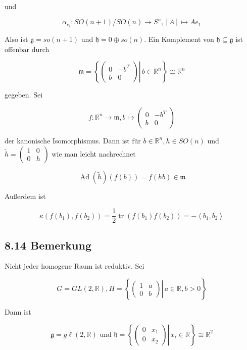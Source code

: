 \documentclass[10pt, letterpaper]{article}
\begin{document}
und

$$
\alpha_{e_{i}}: S O(n+1) / S O(n) \rightarrow S^{n},[A] \mapsto A e_{1}
$$

Also ist $\mathfrak{g}=s o(n+1)$ und $\mathfrak{h}=0 \oplus s o(n)$. Ein Komplement von $\mathfrak{h} \subseteq \mathfrak{g}$ ist offenbar durch

$$
\mathfrak{m}=\left\{\left.\left(\begin{array}{cc}
0 & -b^{T} \\
b & 0
\end{array}\right) \right\rvert\, b \in \mathbb{R}^{n}\right\} \cong \mathbb{R}^{n}
$$

gegeben. Sei

$$
f: \mathbb{R}^{n} \rightarrow \mathfrak{m}, b \mapsto\left(\begin{array}{cc}
0 & -b^{T} \\
b & 0
\end{array}\right)
$$

der kanonische Isomorphismus. Dann ist für $b \in \mathbb{R}^{n}, h \in S O(n)$ und $\tilde{h}=\left(\begin{array}{ll}1 & 0 \\ 0 & h\end{array}\right)$ wie man leicht nachrechnet

$$
\operatorname{Ad}(\tilde{h})(f(b))=f(h b) \in \mathfrak{m}
$$

Außerdem ist

$$
\kappa\left(f\left(b_{1}\right), f\left(b_{2}\right)\right)=\frac{1}{2} \operatorname{tr}\left(f\left(b_{1}\right) f\left(b_{2}\right)\right)=-\left\langle b_{1}, b_{2}\right\rangle
$$

\subsection*{8.14 Bemerkung}
Nicht jeder homogene Raum ist reduktiv. Sei

$$
G=G L(2, \mathbb{R}), H=\left\{\left.\left(\begin{array}{cc}
1 & a \\
0 & b
\end{array}\right) \right\rvert\, a \in \mathbb{R}, b>0\right\}
$$

Dann ist

$$
\mathfrak{g}=g \ell(2, \mathbb{R}) \text { und } \mathfrak{h}=\left\{\left.\left(\begin{array}{ll}
0 & x_{1} \\
0 & x_{2}
\end{array}\right) \right\rvert\, x_{i} \in \mathbb{R}\right\} \cong \mathbb{R}^{2}
$$
\end{document}

